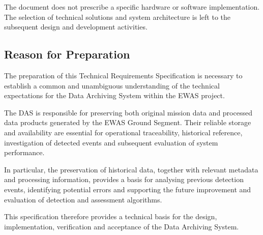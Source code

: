 The document does not prescribe a specific hardware or software implementation. The selection of technical solutions and system architecture is left to the subsequent design and development activities.

\subsection{Reason for Preparation}

The preparation of this Technical Requirements Specification is necessary to establish a common and unambiguous understanding of the technical expectations for the Data Archiving System within the EWAS project.

The DAS is responsible for preserving both original mission data and processed data products generated by the EWAS Ground Segment. Their reliable storage and availability are essential for operational traceability, historical reference, investigation of detected events and subsequent evaluation of system performance.

In particular, the preservation of historical data, together with relevant metadata and processing information, provides a basis for analysing previous detection events, identifying potential errors and supporting the future improvement and evaluation of detection and assessment algorithms.

This specification therefore provides a technical basis for the design, implementation, verification and acceptance of the Data Archiving System.